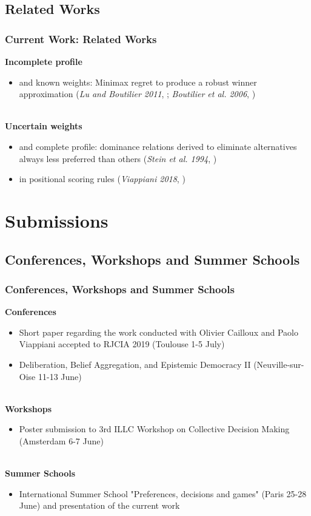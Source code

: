 \documentclass{beamer}
\begin{document}
\subsection{Related Works}
\begin{frame}
	\frametitle{\textbf{Current Work:} Related Works}
	\textbf{Incomplete profile}  
	\begin{itemize}
		\item and known weights: Minimax regret to produce a robust winner approximation (\textit{Lu and Boutilier 2011}, \cite{Lu2011}; \textit{Boutilier et al. 2006}, \cite{Boutilier2006})
	\end{itemize}~\\
	\textbf{Uncertain weights} 
	\begin{itemize}
		\item and complete profile: dominance relations derived to eliminate alternatives always less preferred than others (\textit{Stein et al. 1994}, \cite{Stein1994})
		\item in positional scoring rules (\textit{Viappiani 2018}, \cite{Viappiani2018})
	\end{itemize}
\end{frame}

\section{Submissions}
\subsection{Conferences, Workshops and Summer Schools}
\begin{frame}
	\frametitle{Conferences, Workshops and Summer Schools}
	\textbf{Conferences}  
	\begin{itemize}
		\item Short paper regarding the work conducted with Olivier Cailloux and Paolo Viappiani accepted to RJCIA 2019 (Toulouse 1-5 July)
		\item Deliberation, Belief Aggregation, and Epistemic Democracy II (Neuville-sur-Oise 11-13 June)
	\end{itemize}~\\
	\textbf{Workshops} 
	\begin{itemize}
		\item Poster submission to 3rd ILLC Workshop on Collective Decision Making (Amsterdam 6-7 June)
	\end{itemize}~\\
	\textbf{Summer Schools}  
	\begin{itemize}
		\item International Summer School "Preferences, decisions and games" (Paris 25-28 June) and presentation of the current work
	\end{itemize}
\end{frame}
\end{document}
